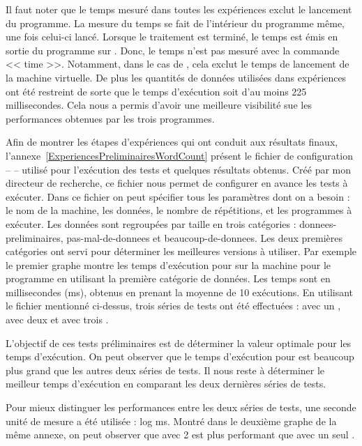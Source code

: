 Il faut noter que le temps mesur\'e dans toutes les exp\'eriences exclut le lancement du programme. La mesure du temps se fait de l'int\'erieur du programme m\^eme, une fois celui-ci lanc\'e. Lorsque le traitement est termin\'e, le temps est \'emis en sortie du programme sur . Donc, le temps n'est pas mesur\'e avec la commande << time >>. Notamment, dans le cas de , cela exclut le temps de lancement de la machine virtuelle. De plus les quantit\'es de donn\'ees utilis\'ees dans exp\'eriences ont \'et\'e restreint de sorte que le temps d'ex\'ecution soit d'au moins 225 millisecondes. Cela nous a permis d'avoir une meilleure visibilit\'e sue les performances obtenues par les trois programmes. 

Afin de montrer les \'etapes d'exp\'eriences qui ont conduit aux r\'esultats finaux, l'annexe~\ref{ExperiencesPreliminairesWordCount} pr\'esent le fichier de configuration --  -- utilis\'e pour l'ex\'ecution des tests et quelques r\'esultats obtenus. Cr\'e\'e par mon directeur de recherche, ce fichier nous permet de configurer en avance les tests \`a ex\'ecuter. Dans ce fichier on peut sp\'ecifier tous les param\`etres dont on a besoin : le nom de la machine, les donn\'ees, le nombre de r\'ep\'etitions, et les programmes \`a ex\'ecuter. Les donn\'ees sont regroup\'ees par taille en trois cat\'egories : donnees-preliminaires, pas-mal-de-donnees et beaucoup-de-donnees. Les deux premi\`eres cat\'egories ont servi pour d\'eterminer les meilleures versions \`a utiliser. Par exemple le premier graphe montre les temps d'ex\'ecution pour  sur la machine  pour le programme  en utilisant la premi\`ere cat\'egorie de donn\'ees. Les temps sont en millisecondes (ms), obtenus en prenant la moyenne de 10 ex\'ecutions.  En utilisant le fichier mentionn\'e ci-dessus, trois s\'eries de tests ont \'et\'e effectu\'ees :  avec un ,  avec deux  et  avec trois . 

L'objectif de ces tests pr\'eliminaires est de d\'eterminer la valeur optimale pour les temps d'ex\'ecution. On peut observer que le temps d'ex\'ecution pour  est beaucoup plus grand que les autres deux s\'eries de tests. Il nous reste \`a d\'eterminer le meilleur temps d'ex\'ecution en comparant les deux derni\`eres s\'eries de tests.

Pour mieux distinguer les performances entre les deux s\'eries de tests, une seconde unit\'e de mesure a \'et\'e utilis\'ee : log ms. Montr\'e dans le deuxi\`eme graphe de la m\^eme annexe, on peut observer que  avec 2  est plus performant que  avec un seul . 

